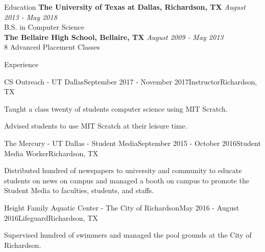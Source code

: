 \documentclass[10pt,a4paper, typewriter]{resume} %
\begin{document}
\begin{rSection}{Education}
{\bf The University of Texas at Dallas, Richardson, TX} \hfill {\em August 2013 - May 2018} \\ 
B.S. in Computer Science \\
{\bf The Bellaire High School, Bellaire, TX} \hfill {\em August 2009 - May 2013} \\ 
8 Advanced Placement Classes
\end{rSection}
\begin{rSection}{Experience}
\begin{rSubsection}{CS Outreach - UT Dallas}{September 2017 - November 2017}{Instructor}{Richardson, TX}
\item Taught a class twenty of students computer science using MIT Scratch.
\item Advised students to use MIT Scratch at their leisure time. 
\end{rSubsection}
\begin{rSubsection}{The Mercury - UT Dallas - Student Media}{September 2015 - October 2016}{Student Media Worker}{Richardson, TX}
\item Distributed hundred of newspapers to university and community to educate students on news on campus and managed a booth on campus to promote the Student Media to faculties, students, and staffs.
\end{rSubsection}
\begin{rSubsection}{Height Family Aquatic Center - The City of Richardson}{May 2016 - August 2016}{Lifeguard}{Richardson, TX}
\item Supervised hundred of swimmers and managed the pool grounds at the City of Richardson.
\end{rSubsection}

\end{rSection}
\end{document}
